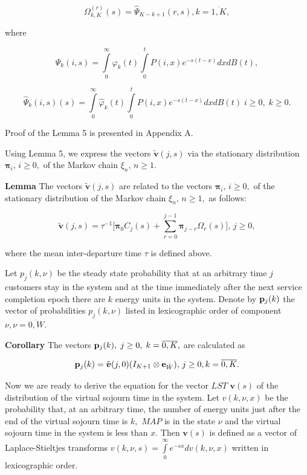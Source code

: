 \documentclass[12pt, a4paper]{article}
\newcommand{\bs}{\boldsymbol}
\begin{document}
$$
\Omega_{k,K}^{(r)} (s)= {\hat\Psi}_{K-k+1}(r,s),
 k=\overline{1,K},
 $$

 where

$$
\Psi_k(i,s) =\int\limits_0^\infty \varphi_k(t)\int\limits_0^t P(i,x)e^{-s(t-x)}dx
dB(t),
$$

$$
\hat \Psi_k(i,s)(s) =\int\limits_0^\infty \hat\varphi_k(t)\int\limits_0^t P(i,x)e^{-s(t-x)}dx
dB(t)\; i \geq 0,\; k \geq 0.
$$




Proof of the Lemma 5 is presented in Appendix A.





Using Lemma 5, we  express  the vectors $\tilde{\boldsymbol v}(j,s)$ via  the stationary distribution  $\boldsymbol{\pi}_i,\, i\geq0,$ of the Markov chain $\xi_n,\,n\geq1.$


{\bf Lemma} The vectors $\tilde{\boldsymbol v}(j,s)$ are related to the  vectors $\boldsymbol{\pi}_i,\, i\geq0,$ of the stationary distribution of the Markov chain $\xi_n,\,n\geq1,$ as follows:

$$
\tilde{\boldsymbol v}(j,s)=\tau^{-1}\biggl[{\bs \pi}_0 C_j(s)+\sum\limits_{r=0}^{j-1}{\bs \pi}_{j-r}\Omega_r(s)\biggr], \,  j\geq 0,
$$

where the mean inter-departure time $\tau$  is defined above.




Let $ p_j(k,\nu)$ be the steady state probability that at an arbitrary time  $j$ customers stay in the system and  at the time immediately after the next  service completion epoch there are $k$  energy units in the system.
Denote by ${\bf p}_j(k)$ the vector of probabilities  $ p_j(k,\nu)$ listed in lexicographic order of component $\nu, \nu=\overline{0, W}.$



{\bf Corollary}
The vectors ${\bf p}_j(k),\; j\geq0,\; k=\overline{0,K},$  are calculated as

$$
{\bf p}_j(k)=\tilde{\boldsymbol v}(j,0)(I_{K+1}\otimes{\bf e}_{\bar{W}}), \, j\geq0, k=\overline{0,K}.
$$



Now we are ready to derive the equation for the vector
 $LST$ $\boldsymbol v(s)$ of
the distribution of the virtual sojourn time in the system. Let
$v(k,\nu,x)$ be the  probability that, at an arbitrary time, the number of energy units just
after the end of the virtual sojourn time  is $k,$
$MAP$  is in the state $\nu$  and the virtual sojourn time in the system  is
less than $x.$
Then
$\boldsymbol v(s)$ is defined as a vector of  Laplace-Stieltjes
transforms $v(k,\nu,s)=\int\limits_0^\infty e^{-sx}dv(k,\nu,x)$
written in lexicographic order.
\end{document}
